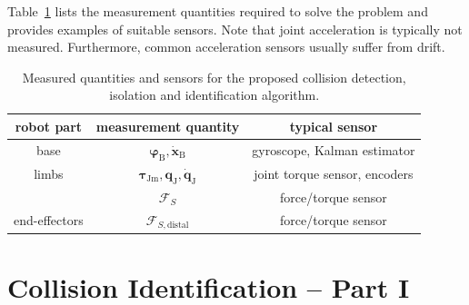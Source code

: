 Table~\ref{tab:sensors} lists the measurement quantities required to solve the problem and provides examples of suitable sensors.
Note that joint acceleration is typically not measured.
Furthermore, common acceleration sensors usually suffer from drift.
%
\begin{table}
\vspace*{0.5cm}
\caption{Measured quantities and sensors for the proposed collision detection, isolation and identification algorithm.}\label{tab:sensors}
\begin{tabular}{|c|c|c|}
\hline
robot part & measurement quantity & typical sensor\\\hline
base & $\bm{\varphi}_\mathrm{B},\dot{\bm{x}}_\mathrm{B}$ & gyroscope, Kalman estimator\\
limbs & $\bm{\tau}_\mathrm{Jm},\bm{q}_\mathrm{J},\dot{\bm{q}}_\mathrm{J}$ & joint torque sensor, encoders\\
 & $\bm{\mathcal{F}}_{S}$ & force/torque sensor\\
end-effectors & $\bm{\mathcal{F}}_{S,\mathrm{distal}}$ & force/torque sensor\\\hline
\end{tabular}\vspace*{-0.7cm}
\end{table}



\section{Collision Identification -- Part I}
\label{sec:collision_identification_i}

